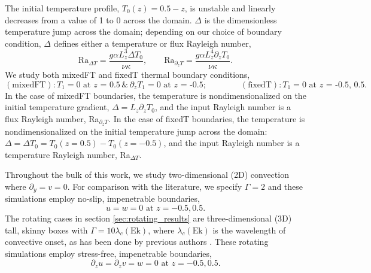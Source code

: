 \documentclass[aps, pre, onecolumn, nofootinbib, notitlepage, groupedaddress, amsfonts, amssymb, amsmath, longbibliography]{revtex4-1}
\begin{document}
The initial temperature profile, $T_0(z) = 0.5 - z$, is unstable and linearly decreases from a value of 1 to 0 across the domain. 
$\Delta$ is the dimensionless temperature jump across the domain; depending on our choice of boundary condition, $\Delta$ defines either a temperature or flux Rayleigh number,
\begin{equation}
\text{Ra}_{\Delta T} = \frac{g \alpha L_z^3 \Delta T_0}{\nu\kappa}, \qquad 
\text{Ra}_{\partial_z T} = \frac{g \alpha L_z^4 \partial_z T_0}{\nu\kappa}.
\end{equation}
We study both mixedFT and fixedT thermal boundary conditions,
\begin{equation}
(\text{mixedFT}): T_1 = 0 \text{ at $z$ = 0.5} \,\&\, \partial_z T_1 = 0 \text{ at $z$ = -0.5};\qquad\qquad
(\text{fixedT}): T_1 = 0 \text{ at $z$ = -0.5, 0.5}.
\end{equation}
In the case of mixedFT boundaries, the temperature is nondimensionalized on the initial temperature gradient, $\Delta = L_z \partial_z T_0$, and the input Rayleigh number is a flux Rayleigh number, Ra$_{\partial_z T}$.
In the case of fixedT boundaries, the temperature is nondimensionalized on the initial temperature jump across the domain: $\Delta = \Delta T_0 =  T_0(z=0.5)-T_0(z=-0.5)$, and the input Rayleigh number is a temperature Rayleigh number, Ra$_{\Delta T}$.



Throughout the bulk of this work, we study two-dimensional (2D) convection where $\partial_y = v = 0$.
For comparison with the literature, we specify $\Gamma = 2$ and these simulations employ no-slip, impenetrable boundaries,
\begin{equation}
u = w = 0 \, \, \text{at}\,\,z = -0.5, 0.5.
\label{eqn:vel_bcs}
\end{equation}
The rotating cases in section \ref{sec:rotating_results} are three-dimensional (3D) tall, skinny boxes with $\Gamma = 10\lambda_c(\text{Ek})$, where $\lambda_c(\text{Ek})$ is the wavelength of convective onset, as has been done by previous authors \cite{stellmach&all2014}. 
These rotating simulations employ stress-free, impenetrable boundaries,
\begin{equation}
\partial_z u = \partial_z v = w = 0 \, \, \text{at}\,\,z = -0.5, 0.5.
\label{eqn:vel_bcs}
\end{equation}
\end{document}
